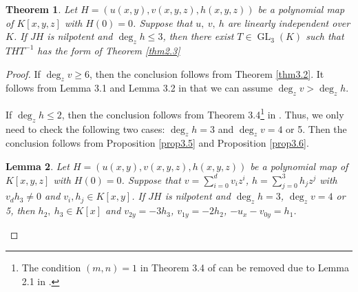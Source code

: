 \documentclass[12pt, twoside, leqno]{article}
\newtheorem{thm}{Theorem}[section]
\newtheorem{lem}[thm]{Lemma}
\theoremstyle{definition}
\numberwithin{equation}{section}
\begin{document}
\begin{thm}\label{thm3.3}
Let $H=(u(x,y),v(x,y,z),h(x,y,z))$ be a polynomial map of $K[x,y,z]$ with $H(0)= 0$. Suppose that $u,~v,~h$ are linearly independent over $K$. If $JH$ is nilpotent and $\deg_zh\leq 3$, then there exist $T\in \operatorname{GL}_3(K)$ such that $THT^{-1}$ has the form of Theorem \ref{thm2.3}
\end{thm}
\begin{proof}
If $\deg_zv\geq 6$, then the conclusion follows from Theorem \ref{thm3.2}. It follows from Lemma 3.1 and Lemma 3.2 in \cite{13} that we can assume $\deg_zv>\deg_zh$.

If $\deg_zh\leq 2$, then the conclusion follows from Theorem 3.4\footnote{The condition $(m,n)=1$ in Theorem 3.4 of \cite{13} can be removed due to Lemma 2.1 in \cite{14}.} in \cite{13}. Thus, we only need to check the following two cases: $\deg_zh=3$ and $\deg_zv=4$ or 5. Then the conclusion follows from Proposition \ref{prop3.5} and Proposition \ref{prop3.6}.

\begin{lem}\label{lem3.4}
Let $H=(u(x,y),v(x,y,z),h(x,y,z))$ be a polynomial map of $K[x,y,z]$ with $H(0)= 0$. Suppose that  $v=\sum_{i=0}^dv_iz^i$, $h=\sum_{j=0}^3h_jz^j$ with $v_dh_3\neq 0$ and $v_i, h_j\in K[x,y]$. If $JH$ is nilpotent and $\deg_zh= 3$, $\deg_zv=4$ or 5, then $h_2,~h_3\in K[x]$ and $v_{2y}=-3h_3$, $v_{1y}=-2h_2$, $-u_x-v_{0y}=h_1$.
\end{lem}


\end{proof}
\end{document}
